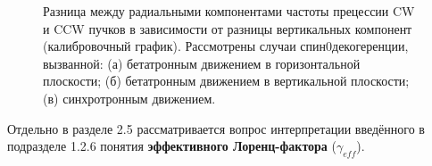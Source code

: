 \begin{figure}[H]
\begin{minipage}{.5\linewidth}
	\end{minipage}%
	\begin{minipage}{.5\linewidth}
	\end{minipage}
	\begin{minipage}{.5\linewidth}
	\end{minipage}%
	\begin{minipage}{.5\linewidth}
	\caption{Разница между радиальными компонентами частоты прецессии CW и CCW пучков
		в зависимости от разницы вертикальных компонент (калибровочный график).\label{fig:calib}
		Рассмотрены случаи спин0декогеренции, вызванной:
	(а) бетатронным движением в горизонтальной плоскости; 
	(б) бетатронным движением в вертикальной плоскости;
	(в) синхротронным движением.
	}
	\end{minipage}
\end{figure}

Отдельно в разделе 2.5 рассматривается вопрос интерпретации введённого в подразделе 1.2.6 понятия 
\textbf{эффективного Лоренц-фактора} ($\gamma_{eff}$). 

